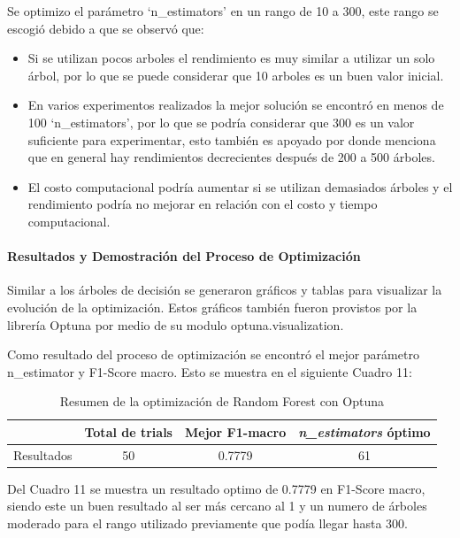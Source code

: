 \documentclass[12pt,a4paper]{article}
\begin{document}
Se optimizo el parámetro `n_estimators' en un rango de 10 a 300, este rango se escogió debido a que se observó que:
\begin{itemize}
  \item Si se utilizan pocos arboles el rendimiento es muy similar a utilizar un solo árbol,
    por lo que se puede considerar que 10 arboles es un buen valor inicial.
  \item En varios experimentos realizados la mejor solución se encontró en menos de 100 `n_estimators',
    por lo que se podría considerar que 300 es un valor suficiente para experimentar, esto también es apoyado por
    \autocite{probstHyperparametersTuningStrategies2019} donde menciona que en general hay
    rendimientos decrecientes después de 200 a 500 árboles.
  \item El costo computacional podría aumentar si se utilizan demasiados árboles y el rendimiento podría no mejorar
    en relación con el costo y tiempo computacional.
\end{itemize}

\paragraph{Resultados y Demostración del Proceso de Optimización}

Similar a los árboles de decisión se generaron gráficos y tablas para visualizar la evolución de la optimización.
Estos gráficos también fueron provistos por la librería Optuna por medio de su modulo optuna.visualization.

Como resultado del proceso de optimización se encontró el mejor parámetro n_estimator y F1-Score macro.
Esto se muestra en el siguiente Cuadro 11:

\begin{table}[htbp]
  \centering
  \begin{tabular}{lccc}
    \hline
    & Total de trials & Mejor F1-macro & \textit{n\_estimators} óptimo \\
    \hline
    Resultados & 50 & 0.7779 & 61 \\
    \hline
  \end{tabular}
  \caption{Resumen de la optimización de Random Forest con Optuna}
  \label{tab:optuna-rf-resumen}
\end{table}

Del Cuadro 11 se muestra un resultado optimo de 0.7779 en F1-Score macro, siendo este un buen resultado al ser más cercano al 1
y un numero de árboles moderado para el rango utilizado previamente que podía llegar hasta 300.
\end{document}
